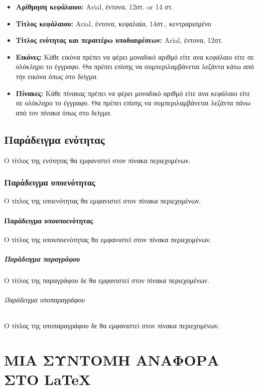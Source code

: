 \documentclass[inscr,ack,preface]{dimscthesis}
\begin{document}
\begin{itemize}
    \item \textbf{Αρίθμηση κεφάλαιου:} Arial, έντονα, 12στ. or 14 στ.
    \item \textbf{Τίτλος κεφάλαιου:} Arial, έντονα, κεφαλαία, 14στ., κεντραρισμένο
    \item \textbf{Τίτλος ενότητας και περαιτέρω υποδιαιρέσεων:} Arial, έντονα, 12στ.
    \item \textbf{Εικόνες:} Κάθε εικόνα πρέπει να φέρει μοναδικό αριθμό είτε ανα κεφάλαιο είτε σε ολόκληρο το έγγραφο.
    Θα πρέπει επίσης να συμπεριλαμβάνεται λεζάντα κάτω από την εικόνα όπως στο δείγμα.
    \item \textbf{Πίνακες:} Κάθε πίνακας πρέπει να φέρει μοναδικό αριθμό είτε ανα κεφάλαιο είτε σε ολόκληρο το έγγραφο.
    Θα πρέπει επίσης να συμπεριλαμβάνεται λεζάντα πάνω από τον πίνακα όπως στο δείγμα.
\end{itemize}

\section{Παράδειγμα ενότητας}

Ο τίτλος της ενότητας θα εμφανιστεί στον πίνακα περιεχομένων.

\subsection{Παράδειγμα υποενότητας}

Ο τίτλος της υποενότητας θα εμφανιστεί στον πίνακα περιεχομένων.

\subsubsection{Παράδειγμα υπουποενότητας}

Ο τίτλος της υπουποενότητας θα εμφανιστεί στον πίνακα περιεχομένων.

\paragraph{Παράδειγμα παραγράφου}

Ο τίτλος της παραγράφου δε θα εμφανιστεί στον πίνακα περιεχομένων.

\subparagraph{Παράδειγμα υποπαραγράφου}

Ο τίτλος της υποπαραγράφου δε θα εμφανιστεί στον πίνακα περιεχομένων.

\chapter{ΜΙΑ ΣΥΝΤΟΜΗ ΑΝΑΦΟΡΑ ΣΤΟ \LaTeX} \label{introduction_to_latex}
\end{document}
